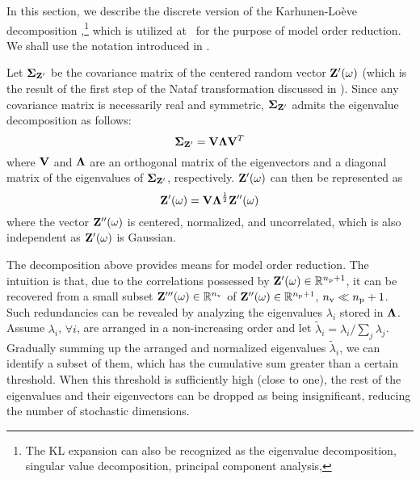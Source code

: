 In this section, we describe the discrete version of the Karhunen-Lo\`{e}ve decomposition \cite{ghanem1991},\footnote{The KL expansion can also be recognized as the eigenvalue decomposition, singular value decomposition, principal component analysis, \etc} which is utilized at \ for the purpose of model order reduction.
We shall use the notation introduced in .

Let $\mCov_{\vZ'}$ be the covariance matrix of the centered random vector $\mathbf{Z}'(\omega)$ (which is the result of the first step of the Nataf transformation discussed in ).
  Since any covariance matrix is necessarily real and symmetric, $\mCov_{\vZ'}$ admits the eigenvalue decomposition \cite{press2007} as follows:
\[
  \mCov_{\vZ'} = \m{V} \m{\Lambda} \m{V}^T
\]
where $\m{V}$ and $\m{\Lambda}$ are an orthogonal matrix of the eigenvectors and a diagonal matrix of the eigenvalues of $\mCov_{\vZ'}$, respectively.
$\mathbf{Z}'(\omega)$ can then be represented as
\[
  \vZ'(\o) = \m{V} \m{\Lambda}^\frac{1}{2} \vZ''(\o)
\]
where the vector $\mathbf{Z}''(\omega)$ is centered, normalized, and uncorrelated, which is also independent as $\mathbf{Z}'(\omega)$ is Gaussian.

The decomposition above provides means for model order reduction.
The intuition is that, due to the correlations possessed by $\mathbf{Z}'(\omega) \in \mathbb{R}^{{n_\text{p}} + 1}$, it can be recovered from a small subset $\mathbf{Z}'''(\omega) \in \mathbb{R}^{n_\text{v}}$ of $\mathbf{Z}''(\omega) \in \mathbb{R}^{{n_\text{p}} + 1}$, ${n_\text{v}} \ll {n_\text{p}} + 1$.
Such redundancies can be revealed by analyzing the eigenvalues $\lambda_i$ stored in $\m{\Lambda}$.
Assume $\lambda_i$, $\forall i$, are arranged in a non-increasing order and let $\tilde{\lambda}_i = \lambda_i / \sum_j \lambda_j$.
Gradually summing up the arranged and normalized eigenvalues $\tilde{\lambda}_i$, we can identify a subset of them, which has the cumulative sum greater than a certain threshold.
When this threshold is sufficiently high (close to one), the rest of the eigenvalues and their eigenvectors can be dropped as being insignificant, reducing the number of stochastic dimensions.
